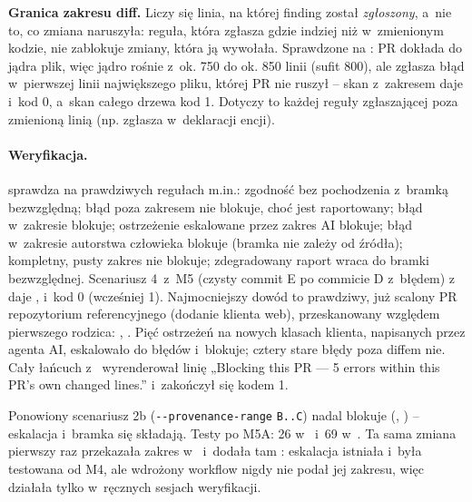 \textbf{Granica zakresu diff.} Liczy się linia, na której finding został \emph{zgłoszony},
a~nie to, co zmiana naruszyła: reguła, która zgłasza gdzie indziej niż w~zmienionym kodzie,
nie zablokuje zmiany, która ją wywołała. Sprawdzone na : PR dokłada do
jądra plik, więc jądro rośnie z~ok. 750 do ok. 850 linii (sufit 800), ale
 zgłasza błąd w~pierwszej linii największego
pliku, której PR nie ruszył -- skan z~zakresem  daje 
 i~kod 0, a~skan całego drzewa kod 1. Dotyczy to każdej reguły zgłaszającej poza
zmienioną linią (np.  zgłasza w~deklaracji encji).

\paragraph{Weryfikacja.}  sprawdza na prawdziwych regułach
m.in.: zgodność bez pochodzenia z~bramką bezwzględną; błąd poza zakresem nie blokuje, choć
jest raportowany; błąd w~zakresie blokuje; ostrzeżenie eskalowane przez zakres AI
blokuje; błąd w~zakresie autorstwa człowieka blokuje (bramka nie zależy od źródła);
kompletny, pusty zakres nie blokuje; zdegradowany raport wraca do bramki bezwzględnej.
Scenariusz 4~z~M5 (czysty commit E po commicie D z~błędem) z~ daje ,  i~kod 0 (wcześniej 1).
Najmocniejszy dowód to prawdziwy, już scalony PR repozytorium referencyjnego (dodanie
klienta web), przeskanowany względem pierwszego rodzica: ,
. Pięć ostrzeżeń 
na nowych klasach klienta, napisanych przez agenta AI, eskalowało do błędów i~blokuje;
cztery stare błędy  poza diffem nie. Cały łańcuch
z~ wyrenderował linię „Blocking this PR — 5 errors within
this PR's own changed lines.” i~zakończył się kodem 1.

Ponowiony scenariusz 2b (\texttt{-{}-provenance-range} \texttt{B..C}) nadal blokuje
(, ) -- eskalacja i~bramka się
składają. Testy po M5A: 26 w~ i~69
w~. Ta sama zmiana pierwszy raz przekazała zakres
w~ i~dodała tam : eskalacja
istniała i~była testowana od M4, ale wdrożony workflow nigdy nie podał jej zakresu, więc
działała tylko w~ręcznych sesjach weryfikacji.

